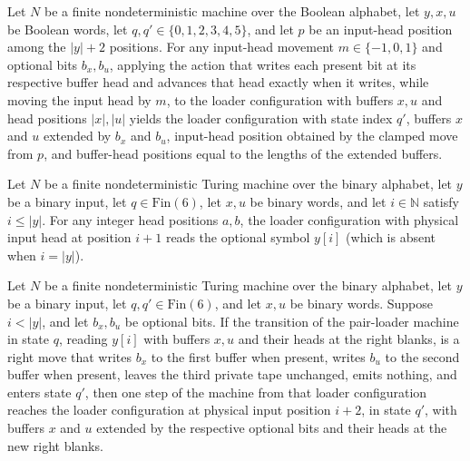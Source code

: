 \begin{lemma}
\label{Complexity.cont_write_apply}
\leanok
{}
Let $N$ be a finite nondeterministic machine over the Boolean alphabet, let $y,x,u$ be
Boolean words, let $q,q'\in\{0,1,2,3,4,5\}$, and let $p$ be an input-head position among
the $|y|+2$ positions. For any input-head movement $m\in\{-1,0,1\}$ and optional bits
$b_x,b_u$, applying the action that writes each present bit at its respective buffer
head and advances that head exactly when it writes, while moving the input head by $m$,
to the loader configuration with buffers $x,u$ and head positions $|x|,|u|$ yields the
loader configuration with state index $q'$, buffers $x$ and $u$ extended by $b_x$ and
$b_u$, input-head position obtained by the clamped move from $p$, and buffer-head
positions equal to the lengths of the extended buffers.
\end{lemma}

\begin{lemma}
\label{Complexity.cont_load_read}
\leanok
{}
Let $N$ be a finite nondeterministic Turing machine over the binary alphabet, let $y$ be
a binary input, let $q\in\mathrm{Fin}(6)$, let $x,u$ be binary words, and let
$i\in\mathbb{N}$ satisfy $i\leq |y|$. For any integer head positions $a,b$, the loader
configuration with physical input head at position $i+1$ reads the optional symbol
$y[i]$ (which is absent when $i=|y|$).
\end{lemma}

\begin{lemma}
\label{Complexity.cont_load_right}
\leanok
{}
Let $N$ be a finite nondeterministic Turing machine over the binary alphabet, let $y$ be
a binary input, let $q,q'\in\mathrm{Fin}(6)$, and let $x,u$ be binary words. Suppose
$i<|y|$, and let $b_x,b_u$ be optional bits. If the transition of the pair-loader
machine in state $q$, reading $y[i]$ with buffers $x,u$ and their heads at the right
blanks, is a right move that writes $b_x$ to the first buffer when present, writes $b_u$
to the second buffer when present, leaves the third private tape unchanged, emits
nothing, and enters state $q'$, then one step of the machine from that loader
configuration reaches the loader configuration at physical input position $i+2$, in
state $q'$, with buffers $x$ and $u$ extended by the respective optional bits and their
heads at the new right blanks.
\end{lemma}

